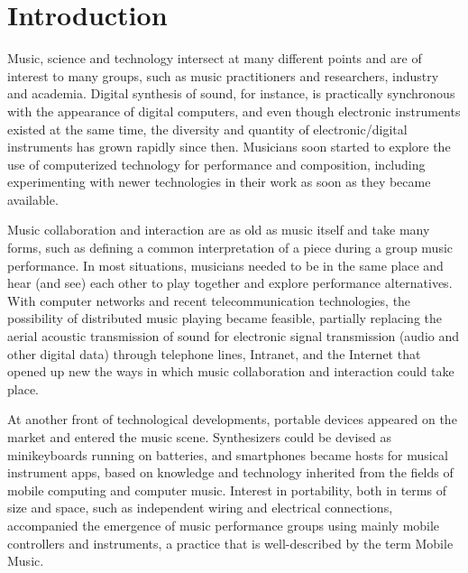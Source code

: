 \chapter{Introduction}
\label{cap:introduction}

Music, science and technology intersect at many different points and are of interest to many groups, such as music practitioners and researchers, industry and academia.
Digital synthesis of sound, for instance, is practically synchronous with the appearance of digital computers, and even though electronic instruments existed at the same time, the diversity and quantity of electronic/digital instruments has grown rapidly since then.
Musicians soon started to explore the use of computerized technology for performance and composition, including experimenting with newer technologies in their work as soon as they became available.

Music collaboration and interaction are as old as music itself and take many forms, such as defining a common interpretation of a piece during a group music performance. 
In most situations, musicians needed to be in the same place and hear (and see) each other to play together and explore performance alternatives.
With computer networks and recent telecommunication technologies, the possibility of distributed music playing became feasible, partially replacing the aerial acoustic transmission of sound for electronic signal transmission (audio and other digital data) through telephone lines, Intranet, and the Internet that opened up new the ways in which music collaboration and interaction could take place.

At another front of technological developments, portable devices appeared on the market and entered the music scene.
Synthesizers could be devised as minikeyboards running on batteries, and smartphones became hosts for musical instrument apps, based on knowledge and technology inherited from the fields of mobile computing and computer music. 
Interest in portability, both in terms of size and space, such as independent wiring and electrical connections, accompanied the emergence of music performance groups using mainly mobile controllers and instruments, a practice that is well-described by the term Mobile Music.

